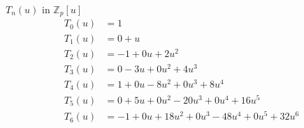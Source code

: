 \documentclass{beamer}
\begin{document}
\begin{frame}{$T_n(u)$ in $\mathbb{Z}_p[u]$}
 \vspace{-6pt}
 \begin{align*}
  T_0(u) & = 1                                         \\
  T_1(u) & = 0+u                                       \\
  T_2(u) & = -1 + 0u + 2u^2                            \\
  T_3(u) & = 0 -3u +0u^2 + 4u^3                        \\
  T_4(u) & = 1+0u-8u^2+0u^3+  8u^4                     \\
  T_5(u) & = 0+5u+0u^2-20u^3+0u^4+ 16u^5               \\
  T_6(u) & = -1 + 0u + 18u^2+0u^3 -48u^4 +0u^5 + 32u^6
 \end{align*}
 \center{\dots}
\end{frame}
\end{document}
